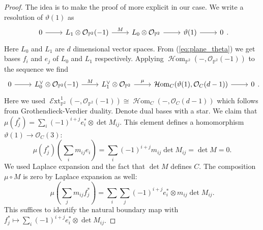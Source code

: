 \documentclass[12pt]{extarticle}
\theoremstyle{definition}
\numberwithin{theorem}{section}
\newcommand{\PP}{\mathbb{P}}
\newcommand{\OO}{\mathcal{O}}
\newcommand{\op}{\operatorname}
\DeclareMathOperator{\Hom}{\mathcal{H}om}
\DeclareMathOperator{\Ext}{\mathcal{E}xt}
\begin{document}
\begin{proof}
The idea is to make the proof of \cite[Theorem B]{Beauville} more explicit in our case. We write a resolution of $\vartheta(1)$ as 
\begin{equation*}
\begin{tikzcd}[ampersand replacement=\&]
	0 \& {L_1\otimes \mathcal{O}_{\mathbb{P}^2}(-1)} \& {L_0\otimes \mathcal{O}_{\mathbb{P}^2}} \& {\vartheta(1)} \& 0
	\arrow[from=1-1, to=1-2]
	\arrow["M",from=1-2, to=1-3]
	\arrow[from=1-3, to=1-4]
	\arrow[from=1-4, to=1-5]
\end{tikzcd}.
\end{equation*}
Here $L_0$ and $L_1$ are $d$ dimensional vector spaces. From (\ref{eq:plane_theta}) we get bases $f_i$ and $e_j$ of $L_0$ and $L_1$ respectively. Applying $\Hom_{\PP^2}(-,\OO_{\PP^2}(-1))$ to the sequence we find
\begin{equation*}
\begin{tikzcd}[ampersand replacement=\&]
	0 \& {L_0^\vee\otimes \mathcal{O}_{\mathbb{P}^2}(-1)} \& {L_1^\vee\otimes \mathcal{O}_{\mathbb{P}^2}} \& {\Hom_{C}(\vartheta(1),\OO_C(d-1))} \& 0
	\arrow[from=1-1, to=1-2]
	\arrow["M", from=1-2, to=1-3]
	\arrow["\mu", from=1-3, to=1-4]
	\arrow[from=1-4, to=1-5]
\end{tikzcd}.
\end{equation*}
Here we used $\Ext^1_{\PP^2}(-,\OO_{\PP^2}(-1)) \cong \Hom_C(-,\OO_{C}(d-1))$ which follows from Grothendieck-Verdier duality. Denote dual bases with a star. We claim that $\mu(f_j^*) = \sum_i (-1)^{i+j} e_i^* \otimes \op{det}M_{ij}$. This element defines a homomorphism $\vartheta(1) \rightarrow \OO_C(3)$:
\begin{equation*}
\mu(f_j^*)(\sum_i m_{ij} e_i) = \sum_i (-1)^{i+j} m_{ij} \op{det} M_{ij} = \op{det} M = 0.
\end{equation*}
We used Laplace expansion and the fact that $\op{det}M$ defines $C$. The composition $\mu \circ M$ is zero by Laplace expansion as well:
\begin{equation*}
\mu(\sum_j m_{ij}f_j^*) = \sum_i \sum_j (-1)^{i+j}e_i^* \otimes m_{ij}\det M_{ij}.
\end{equation*}
This suffices to identify the natural boundary map with $f_j^* \mapsto \sum_i (-1)^{i+j} e_i^* \otimes \op{det}M_{ij}$.
\end{proof}
\end{document}
